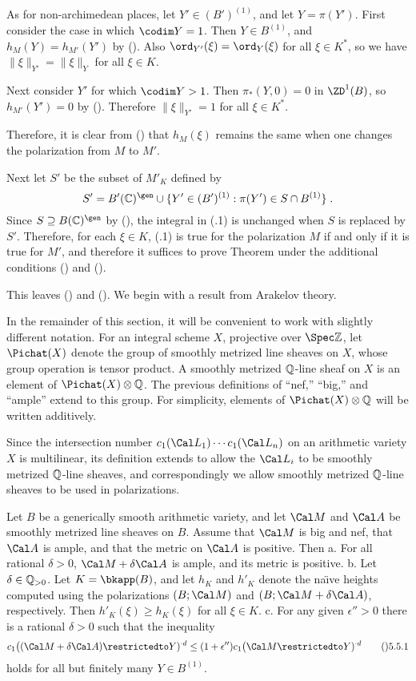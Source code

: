 As for non-archimedean places, let $Y'\in (B')^{(1)}$, and let $Y=\pi(Y')$.
First consider the case in which $\codim Y=1$.  Then $Y\in B^{(1)}$,
and $h_M(Y)=h_{M'}(Y')$ by ().  Also $\ord_{Y'}(\xi)=\ord_Y(\xi)$
for all $\xi\in K^{*}$, so we have $\|\xi\|_{Y'}=\|\xi\|_Y$ for all $\xi\in K$.

Next consider $Y'$ for which $\codim Y>1$.  Then $\pi_{*}(Y,0)=0$
in $\ZD^1(B)$, so $h_{M'}(Y')=0$ by ().  Therefore $\|\xi\|_{Y'}=1$
for all $\xi\in K^{*}$.

Therefore, it is clear from () that $h_M(\xi)$ remains the same when one
changes the polarization from $M$ to $M'$.

Next let $S'$ be the subset of $M'_K$ defined by
$$S' = B'(\Bbb C)^\gen \cup
  \{Y'\in (B')^{(1)}:\pi(Y')\in S\cap B^{(1)}\}\;.$$
Since $S\supseteq B(\Bbb C)^\gen$ by (), the integral
in (.1) is unchanged when $S$ is replaced by $S'$.  Therefore,
for each $\xi\in K$, (.1) is true for the polarization $M$ if and only if
it is true for $M'$, and therefore it suffices to prove Theorem 
under the additional conditions () and ().

This leaves () and ().  We begin with a result from Arakelov theory.

In the remainder of this section, it will be convenient to work with slightly
different notation.  For an integral scheme $X$, projective over $\Spec\Bbb Z$,
let $\Pichat(X)$ denote the group of smoothly metrized line sheaves on $X$,
whose group operation is tensor product.
A {\bc smoothly metrized $\Bbb Q$\snug-line sheaf} on $X$ is an element of
$\Pichat(X)\otimes\Bbb Q$.  The previous definitions of ``nef,'' ``big,''
and ``ample'' extend to this group.  For simplicity, elements
of $\Pichat(X)\otimes\Bbb Q$ will be written additively.

Since the intersection number $c_1(\Cal L_1)\dotsm c_1(\Cal L_n)$ on an
arithmetic variety $X$ is multilinear, its definition extends to allow
the $\Cal L_i$ to be smoothly metrized $\Bbb Q$\snug-line sheaves, and
correspondingly we allow smoothly metrized $\Bbb Q$\snug-line sheaves
to be used in polarizations.

  Let $B$ be a generically smooth arithmetic variety, and
let $\Cal M$ and $\Cal A$ be smoothly metrized line sheaves on $B$.
Assume that $\Cal M$ is big and nef, that $\Cal A$ is ample, and that the
metric on $\Cal A$ is positive.  Then
\roster
\myitem a.  For all rational $\delta>0$, $\Cal M+\delta\Cal A$ is ample,
  and its metric is positive.
\myitem b.  Let $\delta\in\Bbb Q_{>0}$.  Let $K=\bkapp(B)$, and
  let $h_K$ and $h'_K$ denote the na\"{\i}ve heights computed using
  the polarizations $(B;\Cal M)$ and $(B;\Cal M+\delta\Cal A)$,
  respectively.  Then $h'_K(\xi)\ge h_K(\xi)$ for all $\xi\in K$.
\myitem c.  For any given $\epsilon''>0$ there is a rational $\delta>0$
  such that the inequality
  $$c_1\bigl((\Cal M+\delta\Cal A)\restrictedto Y)^{{}\cdot d}
    \le (1+\epsilon'')c_1\bigl(\Cal M\restrictedto Y)^{{}\cdot d}\tag\05.5.1$$
  holds for all but finitely many $Y\in B^{(1)}$.
\endroster
\endit

